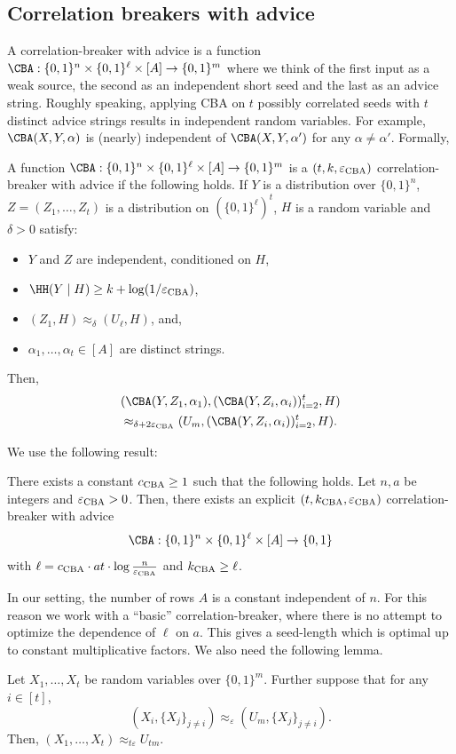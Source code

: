 \subsection*{Correlation breakers with advice}
A correlation-breaker with advice is a function $\CBA:\{0,1\}^n\times\{0,1\}^\ell\times[A]\to\{0,1\}^m$ where we think of the first input as a weak source, the second as an independent short seed and the last as an advice string. Roughly speaking, applying CBA on $t$ possibly correlated seeds with $t$ distinct advice strings results in independent random variables. For example, $\CBA(X,Y,\alpha)$ is (nearly) independent of $\CBA(X,Y,\alpha')$ for any $\alpha\ne\alpha'$. Formally,
\begin{definition}
A function $\CBA:\{0,1\}^n\times\{0,1\}^\ell\times[A]\to\{0,1\}^m$ is a $(t,k,\varepsilon_{\rm CBA})$ correlation-breaker with advice if the following holds. If $Y$ is a distribution over $\{0,1\}^n$, $Z=(Z_1,\ldots,Z_t)$ is a distribution on $(\{0,1\}^\ell)^t$, $H$ is a random variable and $\delta>0$ satisfy:
\begin{itemize}
\item $Y$ and $Z$ are independent, conditioned on $H$,
\item $\HH(Y\mid H)\ge k+\log(1/\varepsilon_{\rm CBA})$,
\item $(Z_1,H)\approx_\delta(U_\ell,H)$, and,
\item $\alpha_1,\ldots,\alpha_t\in[A]$ are distinct strings.
\end{itemize}
Then,
\begin{multline*}
(\CBA(Y,Z_1,\alpha_1),(\CBA(Y,Z_i,\alpha_i))_{i=2}^t,H)\\
\approx_{\delta+2\varepsilon_{\rm CBA}}(U_m,(\CBA(Y,Z_i,\alpha_i))_{i=2}^t,H).
\end{multline*}
\end{definition}
We use the following result:
\begin{theorem}[{[13, Theorem 4.12]}]
There exists a constant $c_{\rm CBA}\ge1$ such that the following holds. Let $n,a$ be integers and $\varepsilon_{\rm CBA}>0$. Then, there exists an explicit $(t,k_{\rm CBA},\varepsilon_{\rm CBA})$ correlation-breaker with advice
\[\CBA:\{0,1\}^n\times\{0,1\}^\ell\times[A]\to\{0,1\}\]
with $\ell=c_{\rm CBA}\cdot at\cdot\log\frac n{\varepsilon_{\rm CBA}}$ and $k_{\rm CBA}\ge\ell$.
\end{theorem}
In our setting, the number of rows $A$ is a constant independent of $n$. For this reason we work with a ``basic'' correlation-breaker, where there is no attempt to optimize the dependence of $\ell$ on $a$. This gives a seed-length which is optimal up to constant multiplicative factors.
We also need the following lemma.
\begin{lemma}
Let $X_1,\ldots,X_t$ be random variables over $\{0,1\}^m$. Further suppose that for any $i\in[t]$,
\[(X_i,\{X_j\}_{j\ne i})\approx_\varepsilon(U_m,\{X_j\}_{j\ne i}).\]
Then, $(X_1,\ldots,X_t)\approx_{t\varepsilon}U_{tm}$.
\end{lemma}
